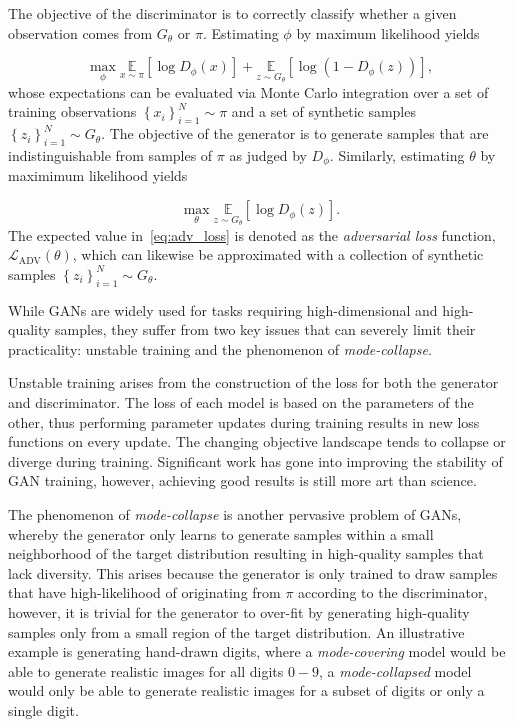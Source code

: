 The objective of the discriminator is to correctly classify whether a given observation comes from $G_\theta$ or $\pi$.
Estimating $\phi$ by maximum likelihood yields

\begin{equation}
    \max_{\phi} \underset{x \sim \pi}{\mathbb{E}}\left[ \log D_\phi(x) \right] + \underset{z \sim G_\theta}{\mathbb{E}}\left[ \log \left( 1 - D_\phi(z)\right) \right], \nonumber
\end{equation}
whose expectations can be evaluated via Monte Carlo integration over a set of training observations
$\left\{ x_i \right\}_{i=1}^N \sim \pi$ and a set of synthetic samples $\left\{ z_i \right\}_{i=1}^N \sim G_\theta$.
The objective of the generator is to generate samples that are indistinguishable from samples of $\pi$ as judged by $D_\phi$.
Similarly, estimating $\theta$ by maximimum likelihood yields

\begin{equation}
    \max_{\theta} \underset{z \sim G_\theta}{\mathbb{E}}\left[ \log D_\phi(z) \right].
    \label{eq:adv_loss}
\end{equation}
The expected value in~\eqref{eq:adv_loss} is denoted as the \textit{adversarial loss} function,
$\mathcal{L}_{\text{ADV}}(\theta)$, which can likewise be approximated with a collection of synthetic samples
$\left\{ z_i \right\}_{i=1}^N \sim G_\theta$.

While GANs are widely used for tasks requiring high-dimensional and high-quality samples, they suffer from two key
issues that can severely limit their practicality: unstable training and the phenomenon of \textit{mode-collapse}.

Unstable training arises from the construction of the loss for both the generator and discriminator.
The loss of each model is based on the parameters of the other, thus performing parameter updates during training
results in new loss functions on every update.
The changing objective landscape tends to collapse or diverge during training.
Significant work has gone into improving the stability of GAN training, however, achieving good results is still more
art than science.

The phenomenon of \textit{mode-collapse} is another pervasive problem of GANs, whereby the generator only learns to
generate samples within a small neighborhood of the target distribution resulting in high-quality samples that lack
diversity.
This arises because the generator is only trained to draw samples that have high-likelihood of originating from $\pi$
according to the discriminator, however, it is trivial for the generator to over-fit by generating high-quality samples
only from a small region of the target distribution.
An illustrative example is generating hand-drawn digits, where a \textit{mode-covering} model would be able to generate
realistic images for all digits $0-9$, a \textit{mode-collapsed} model would only be able to generate realistic images
for a subset of digits or only a single digit.

